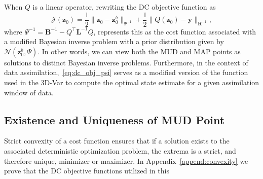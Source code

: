\documentclass[final,1p,times]{elsarticle}
\begin{document}
When $Q$ is a linear operator, rewriting the DC objective function as
\begin{equation}
      \mathcal{J}\left(\mathbf{z}_{0}\right)  = \frac{1}{2}\| \mathbf{z}_{0} - \mathbf{z}_0^b \|_{\Psi^{-1}} +  \frac{1}{2}\|Q\left(\mathbf{z}_{0} \right) - \mathbf{y} \|_{\mathbf{R}^{-1}},   \label{eq:dc_obj_psi}
\end{equation}
where $\Psi^{-1} = \mathbf{B}^{-1} - Q^\top\mathbf{L}^{-1} Q$, represents this as the cost function associated with a modified Bayesian inverse problem with a prior distribution given by $ \mathcal{N} \left(\mathbf{z}_0^b,\Psi\right) $. 
In other words, we can view both the MUD and MAP points as solutions to distinct Bayesian inverse problems. 
Furthermore, in the context of data assimilation,~\eqref{eq:dc_obj_psi} serves as a modified version of the function used in the 3D-Var to compute the optimal state estimate for a given assimilation window of data.


\subsection{Existence and Uniqueness of MUD Point}\label{subsec:existence_unique_mud}

Strict convexity of a cost function ensures that if a solution exists to the associated deterministic optimization problem, the extrema is a strict, and therefore unique, minimizer or maximizer. 
In Appendix~\ref{append:convexity} we prove that the DC objective functions utilized in this
\end{document}
